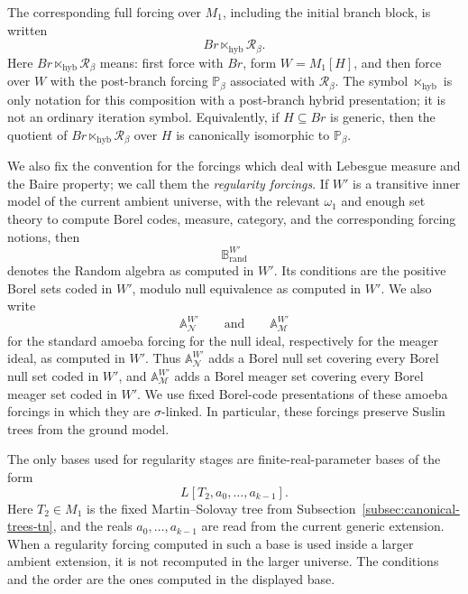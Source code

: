 \documentclass[a4paper,11pt]{article}
\newcommand{\hybcomp}{\mathbin{\ltimes_{\mathrm{hyb}}}}
\begin{document}
The corresponding full forcing over \(M_1\), including the initial branch block,
is written
\[
   Br\hybcomp\mathcal R_\beta .
\]
Here \(Br\hybcomp\mathcal R_\beta\) means: first force with \(Br\), form
\(W=M_1[H]\), and then force over \(W\) with the post-branch forcing
\(\mathbb P_\beta\) associated with \(\mathcal R_\beta\).  The symbol
\(\hybcomp\) is only notation for this composition with a post-branch hybrid
presentation; it is not an ordinary iteration symbol.  Equivalently, if
\(H\subseteq Br\) is generic, then the quotient of \(Br\hybcomp\mathcal R_\beta\)
over \(H\) is canonically isomorphic to \(\mathbb P_\beta\).

We also fix the convention for the forcings which deal with Lebesgue measure and
the Baire property; we call them the \emph{regularity forcings}.  If \(W'\) is a
transitive inner model of the current ambient universe, with the relevant
\(\omega_1\) and enough set theory to compute Borel codes, measure, category,
and the corresponding forcing notions, then
\[
   \mathbb B_{\mathrm{rand}}^{W'}
\]
denotes the Random algebra as computed in \(W'\).  Its conditions are the
positive Borel sets coded in \(W'\), modulo null equivalence as computed in
\(W'\).  We also write
\[
   \mathbb A_{\mathcal N}^{W'}
   \qquad\text{and}\qquad
   \mathbb A_{\mathcal M}^{W'}
\]
for the standard amoeba forcing for the null ideal, respectively for the meager
ideal, as computed in \(W'\).  Thus \(\mathbb A_{\mathcal N}^{W'}\) adds a
Borel null set covering every Borel null set coded in \(W'\), and
\(\mathbb A_{\mathcal M}^{W'}\) adds a Borel meager set covering every Borel
meager set coded in \(W'\).  We use fixed Borel-code presentations of these
amoeba forcings in which they are \(\sigma\)-linked.  In particular, these
forcings preserve Suslin trees from the ground model.

The only bases used for regularity stages are finite-real-parameter bases of
the form
\[
   L[T_2,a_0,\ldots,a_{k-1}].
\]
Here \(T_2\in M_1\) is the fixed Martin--Solovay tree from
Subsection~\ref{subsec:canonical-trees-tn}, and the reals
\(a_0,\ldots,a_{k-1}\) are read from the current generic extension.  When a
regularity forcing computed in such a base is used inside a larger ambient
extension, it is not recomputed in the larger universe.  The conditions and the
order are the ones computed in the displayed base.
\end{document}
